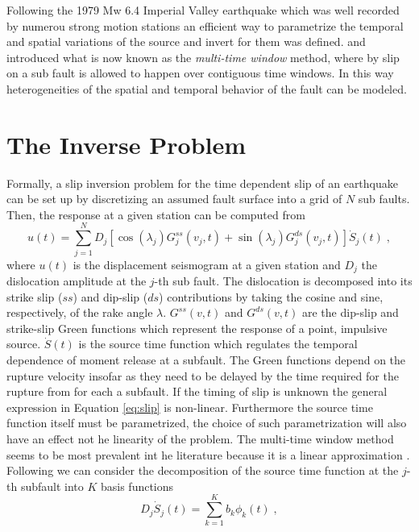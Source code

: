 Following the 1979 Mw 6.4 Imperial Valley earthquake which was well recorded by numerou strong motion stations an efficient way to parametrize the temporal and spatial variations of the source and invert for them was defined. \citet{olson1982} and \citet{hartzell1983} introduced what is now known as the \textit{multi-time window} method, where by slip on a sub fault is allowed to happen over contiguous time windows. In this way heterogeneities of the spatial and temporal behavior of the fault can be modeled.

\section{The Inverse Problem}

Formally, a slip inversion problem for the time dependent slip of an earthquake can be set up by discretizing an assumed fault surface into a grid of $N$ sub faults. Then, the response at a given station can be computed from
\begin{equation}
\label{eq:slip}
u(t)=\sum_{j=1}^ND_j[\cos(\lambda_j)G_j^{ss}(v_j,t)+\sin(\lambda_j)G_j^{ds}(v_j,t)]\dot{S}_j(t)\;,
\end{equation}
where $u(t)$ is the displacement seismogram at a given station and $D_j$ the dislocation amplitude at the $j$-th sub fault. The dislocation is decomposed into its strike slip ($ss$) and dip-slip ($ds$) contributions by taking the cosine and sine, respectively, of the rake angle $\lambda$. $G^{ss}(v,t)$ and $G^{ds}(v,t)$ are the dip-slip and strike-slip Green functions which represent the response of a point, impulsive source. $\dot{S}(t)$ is the source time function which regulates the temporal dependence of moment release at a subfault. The Green functions depend on the rupture velocity insofar as they need to be delayed by the time required for the rupture from for each a subfault. If the timing of slip is unknown the general expression in Equation \ref{eq:slip} is non-linear. Furthermore the source time function itself must be parametrized, the choice of such parametrization will also have an effect not he linearity of the problem.
	The multi-time window method seems to be most prevalent int he literature because it is a linear approximation \citep{ide2007}. Following \citep{ide1996} we can consider the decomposition of the source time function at the $j$-th subfault into $K$ basis functions
\begin{equation}
D_j\dot{S}_j(t)=\sum_{k=1}^Kb_k\phi_k(t)\;,
\end{equation}
